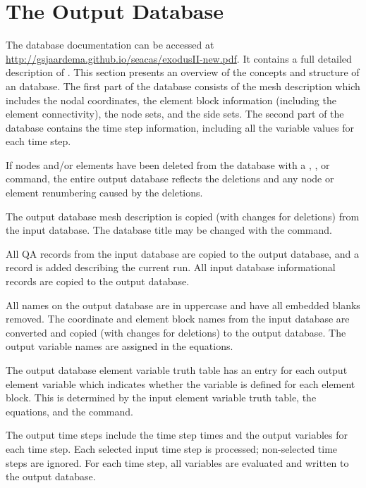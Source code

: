 \chapter{The Output \exo{} Database} \label{chap:outexo}

The \exo{} database documentation can be accessed at
\url{http://gsjaardema.github.io/seacas/exodusII-new.pdf}. It contains
a full detailed description of \exo{}. This section presents an
overview of the concepts and structure of an \exo{} database. The
first part of the \exo{} database consists of the mesh
description which includes the nodal coordinates, the
element block information (including the element connectivity), the
node sets, and the side sets. The second part of the database contains
the time step information, including all the variable values for each
time step.

If nodes and/or elements have been deleted from the database with a
, , or  command, the entire output
database reflects the deletions and any node or element renumbering
caused by the deletions.

The output database mesh description is copied (with changes for
deletions) from the input database. The database title may be changed
with the  command.

All QA records from the input database are copied to the output
database, and a record is added describing the current \caps{\PROGRAM}
run. All input database informational records are copied to the output
database.

All names on the output database are in uppercase and have all embedded
blanks removed. The coordinate and element block names from the input
database are converted and copied (with changes for deletions) to the
output database. The output variable names are assigned in the
equations.

The output database element variable truth table has an entry for each
output element variable which indicates whether the variable is defined
for each element block. This is determined by the input element variable
truth table, the equations, and the  command.

The output time steps include the time step times and the output
variables for each time step. Each selected input time step is
processed; non-selected time steps are ignored. For
each time step, all variables are evaluated and written to the
output database.
